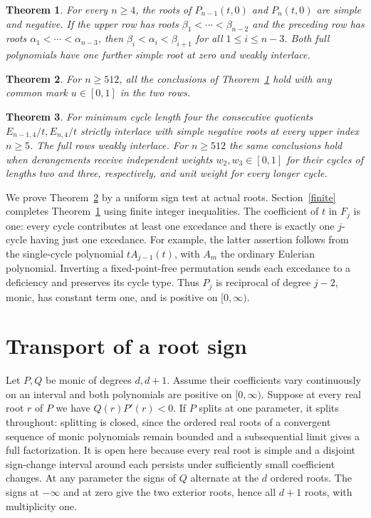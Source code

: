 \documentclass[11pt]{article}
\newtheorem{theorem}{Theorem}
\begin{document}
\begin{theorem}\label{main}
For every \(n\ge4\), the roots of \(P_{n-1}(t,0)\) and \(P_n(t,0)\) are simple and negative. If the upper row has roots \(\beta_1<\cdots<\beta_{n-2}\) and the preceding row has roots \(\alpha_1<\cdots<\alpha_{n-3}\), then \(\beta_i<\alpha_i<\beta_{i+1}\) for all \(1\le i\le n-3\). Both full polynomials have one further simple root at zero and weakly interlace.
\end{theorem}
\begin{theorem}\label{family}
For \(n\ge512\), all the conclusions of Theorem~\ref{main} hold with any common mark \(u\in[0,1]\) in the two rows.
\end{theorem}
\begin{theorem}\label{four}
For minimum cycle length four the consecutive quotients \(E_{n-1,4}/t,E_{n,4}/t\) strictly interlace with simple negative roots at every upper index \(n\ge5\). The full rows weakly interlace. For \(n\ge512\) the same conclusions hold when derangements receive independent weights \(w_2,w_3\in[0,1]\) for their cycles of lengths two and three, respectively, and unit weight for every longer cycle.
\end{theorem}
We prove Theorem~\ref{family} by a uniform sign test at actual roots. Section~\ref{finite} completes Theorem~\ref{main} using finite integer inequalities. The coefficient of \(t\) in \(F_j\) is one: every cycle contributes at least one excedance and there is exactly one \(j\)-cycle having just one excedance. For example, the latter assertion follows from the single-cycle polynomial \(tA_{j-1}(t)\), with \(A_m\) the ordinary Eulerian polynomial. Inverting a fixed-point-free permutation sends each excedance to a deficiency and preserves its cycle type. Thus \(P_j\) is reciprocal of degree \(j-2\), monic, has constant term one, and is positive on \([0,\infty)\).

\section{Transport of a root sign}\label{transport}
Let \(P,Q\) be monic of degrees \(d,d+1\). Assume their coefficients vary continuously on an interval and both polynomials are positive on \([0,\infty)\). Suppose at every real root \(r\) of \(P\) we have \(Q(r)P'(r)<0\). If \(P\) splits at one parameter, it splits throughout: splitting is closed, since the ordered real roots of a convergent sequence of monic polynomials remain bounded and a subsequential limit gives a full factorization. It is open here because every real root is simple and a disjoint sign-change interval around each persists under sufficiently small coefficient changes. At any parameter the signs of \(Q\) alternate at the \(d\) ordered roots. The signs at \(-\infty\) and at zero give the two exterior roots, hence all \(d+1\) roots, with multiplicity one.
\end{document}
